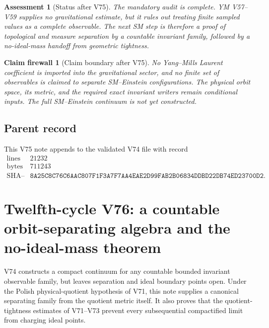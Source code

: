 \documentclass[11pt]{article}
\newtheorem{firewall}[theorem]{Claim firewall}
\newtheorem{assessment}[theorem]{Assessment}
\theoremstyle{remark}
\begin{document}
\begin{assessment}[Status after V75]
\label{ass:v12v75-status}
The mandatory audit is complete.  YM V57--V59 supplies no
gravitational estimate, but it rules out treating finite sampled
values as a complete observable.  The next SM step is therefore a
proof of topological and measure separation by a countable invariant
family, followed by a no-ideal-mass handoff from geometric tightness.
\end{assessment}

\begin{firewall}[Claim boundary after V75]
\label{fire:v12v75-claim}
No Yang--Mills Laurent coefficient is imported into the gravitational
sector, and no finite set of observables is claimed to separate
SM--Einstein configurations.  The physical orbit space, its metric,
and the required exact invariant writers remain conditional inputs.
The full SM--Einstein continuum is not yet constructed.
\end{firewall}

\subsection{Parent record}

This V75 note appends to the validated V74 file with record
\[
\begin{array}{c|c}
\text{lines}&21232\\
\text{bytes}&711243\\
\text{SHA--256}&
\texttt{8A25C8C76C6AAC807F1F3A7F7AA4EAE2D99FAB2B06834DDBD22DB74ED23700D2}.
\end{array}
\]



\section{Twelfth-cycle V76: a countable orbit-separating algebra and
the no-ideal-mass theorem}
\label{sec:v12v76}

V74 constructs a compact continuum for any countable bounded
invariant observable family, but leaves separation and ideal boundary
points open.  Under the Polish physical-quotient hypothesis of V71,
this note supplies a canonical separating family from the quotient
metric itself.  It also proves that the quotient-tightness estimates
of V71--V73 prevent every subsequential compactified limit from
charging ideal points.
\end{document}

